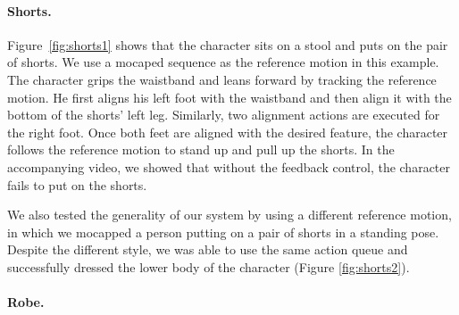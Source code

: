 \paragraph{Shorts.} Figure~\ref{fig:shorts1} shows that the character sits on a stool and puts on the pair of shorts. We use a mocaped sequence as the reference motion in this example. The character grips the waistband and leans forward by tracking the reference motion. He first aligns his left foot with the waistband and then align it with the bottom of the shorts' left leg. Similarly, two alignment actions are executed for the right foot. Once both feet are aligned with the desired feature, the character follows the reference motion to stand up and pull up the shorts. In the accompanying video, we showed that without the feedback control, the character fails to put on the shorts.

We also tested the generality of our system by using a different reference motion, in which we mocapped a person putting on a pair of shorts in a standing pose. Despite the different style, we was able to use the same action queue and successfully dressed the lower body of the character (Figure \ref{fig:shorts2}).

\paragraph{Robe.}






